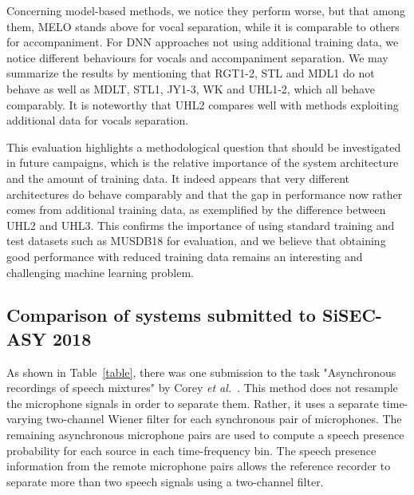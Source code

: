\documentclass{article}
\begin{document}
Concerning model-based methods, we notice they perform worse, but that among them, MELO stands above for vocal separation, while it is comparable to others for accompaniment. For DNN approaches not using additional training data, we notice different behaviours for vocals and accompaniment separation. We may summarize the results by mentioning that RGT1-2, STL and MDL1 do not behave as well as MDLT, STL1, JY1-3, WK and UHL1-2, which all behave comparably. It is noteworthy that UHL2 compares well with methods exploiting additional data for vocals separation.

 This evaluation highlights a methodological question that should be investigated in future campaigns, which is the relative importance of the system architecture and the amount of training data. It indeed appears that very different architectures do behave comparably and that the gap in performance now rather comes from additional training data, as exemplified by the difference between UHL2 and UHL3. This confirms the importance of using standard training and test datasets such as MUSDB18 for evaluation, and we believe that obtaining good performance with reduced training data remains an interesting and challenging machine learning problem.


\subsection{Comparison of systems submitted to SiSEC-ASY 2018}
As shown in Table~\ref{table}, there was one submission to the task "Asynchronous recordings of speech mixtures" by Corey {\it et al.}~\cite{corey}.
This method does not resample the microphone signals in order to separate them. Rather, it uses a separate time-varying two-channel Wiener filter for each synchronous pair of microphones. The remaining asynchronous microphone pairs are used to compute a speech presence probability for each source in each time-frequency bin. The speech presence information from the remote microphone pairs allows the reference recorder to separate more than two speech signals using a two-channel filter.
\end{document}

